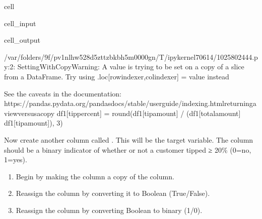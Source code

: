 \documentclass[letterpaper,10pt,english]{sphinxmanual}
\begin{document}
\begin{sphinxuseclass}{cell}
\begin{sphinxuseclass}{cell_input}
\begin{sphinxVerbatim}[commandchars=\\\{\}]
\PYG{p}{[}\PYG{p}{]}  \PYG{p}{[}\PYG{p}{]}  \PYG{p}{[}\PYG{p}{]}  \PYG{p}{[}\PYG{p}{]} 
\end{sphinxVerbatim}

\end{sphinxuseclass}
\begin{sphinxuseclass}{cell_output}
\begin{sphinxVerbatim}[commandchars=\\\{\}]
/var/folders/9f/pv1nlhw528d\PYGZus{}5zttzbkb\PYGZus{}h5m0000gn/T/ipykernel\PYGZus{}70614/1025802444.py:2: SettingWithCopyWarning: 
A value is trying to be set on a copy of a slice from a DataFrame.
Try using .loc[row\PYGZus{}indexer,col\PYGZus{}indexer] = value instead

See the caveats in the documentation: https://pandas.pydata.org/pandas\PYGZhy{}docs/stable/user\PYGZus{}guide/indexing.html\PYGZsh{}returning\PYGZhy{}a\PYGZhy{}view\PYGZhy{}versus\PYGZhy{}a\PYGZhy{}copy
  df1[\PYGZsq{}tip\PYGZus{}percent\PYGZsq{}] = round(df1[\PYGZsq{}tip\PYGZus{}amount\PYGZsq{}] / (df1[\PYGZsq{}total\PYGZus{}amount\PYGZsq{}] \PYGZhy{} df1[\PYGZsq{}tip\PYGZus{}amount\PYGZsq{}]), 3)
\end{sphinxVerbatim}

\end{sphinxuseclass}
\end{sphinxuseclass}
\sphinxAtStartPar
Now create another column called . This will be the target variable. The column should be a binary indicator of whether or not a customer tipped ≥ 20\% (0=no, 1=yes).
\begin{enumerate}
%
\item {} 
\sphinxAtStartPar
Begin by making the  column a copy of the  column.

\item {} 
\sphinxAtStartPar
Reassign the column by converting it to Boolean (True/False).

\item {} 
\sphinxAtStartPar
Reassign the column by converting Boolean to binary (1/0).

\end{enumerate}
\end{document}
